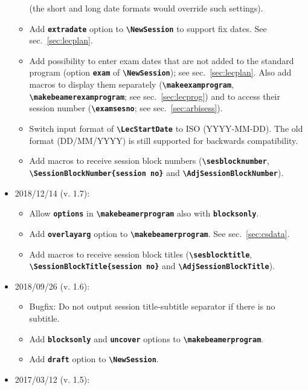 \documentclass[english]{article}
\newcommand*\jmacro[1]{\textbf{\texttt{#1}}}
\newcommand*\jcsmacro[1]{\jmacro{\textbackslash{#1}}}
\newcommand*\joption[1]{\textbf{\texttt{#1}}}
\newcommand*\jparam[1]{\angus #1\angud}
\begin{document}
\begin{itemize}
\begin{itemize}
		      (the short and long date formats would override such settings).
		\item Add \joption{extradate} option to \jcsmacro{NewSession} to support fix dates.
		      See sec.~\ref{sec:lecplan}.
		\item Add possibility to enter exam dates that are not added to the standard program
		      (option \joption{exam} of \jcsmacro{NewSession}); see sec.~\ref{sec:lecplan}.
		      Also add macros to display them separately (\jcsmacro{makeexamprogram},
		      \jcsmacro{makebeamerexamprogram}; see sec.~\ref{sec:lecprog}) and to
		      access their session number (\jcsmacro{examsesno}; see sec.~\ref{sec:arbisess}).
		\item Switch input format of \jcsmacro{LecStartDate} to ISO (YYYY-MM-DD). The old format
		      (DD/MM/YYYY) is still supported for backwards compatibility.
		\item Add macros to receive session block numbers (\jcsmacro{sesblocknumber},\\
		      \jcsmacro{SessionBlockNumber\{\jparam{session no}\}} and \jcsmacro{AdjSessionBlockNumber}).
	\end{itemize}
\item 2018/12/14 (v. 1.7):
	\begin{itemize}
		\item Allow \joption{options} in \jcsmacro{makebeamerprogram} also with \joption{blocksonly}.
		\item Add \joption{overlayarg} option to \jcsmacro{makebeamerprogram}. See sec.~\ref{sec:csdata}.
		\item Add macros to receive session block titles (\jcsmacro{sesblocktitle},\\
		      \jcsmacro{SessionBlockTitle\{\jparam{session no}\}} and \jcsmacro{AdjSessionBlockTitle}).
	\end{itemize}
\item 2018/09/26 (v. 1.6):
	\begin{itemize}
	    \item Bugfix: Do not output session title-subtitle separator if there is no	subtitle.
	    \item Add \joption{blocksonly} and \joption{uncover} options to \jcsmacro{makebeamerprogram}.
	    \item Add \joption{draft} option to \jcsmacro{NewSession}.
    \end{itemize}
\item 2017/03/12 (v. 1.5):
	\begin{itemize}

\end{itemize}
\end{itemize}
\end{document}
